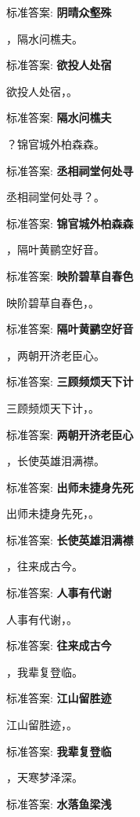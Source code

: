 \documentclass[12pt, a4paper, addpoints]{exam}
\begin{document}
\begin{questions}
标准答案: \textbf{阴晴众壑殊}

\question[1] \uline{\qquad\qquad\qquad}，隔水问樵夫。

标准答案: \textbf{欲投人处宿}

\question[1] 欲投人处宿，\uline{\qquad\qquad\qquad}。

标准答案: \textbf{隔水问樵夫}

\question[1] \uline{\qquad\qquad\qquad}？锦官城外柏森森。

标准答案: \textbf{丞相祠堂何处寻}

\question[1] 丞相祠堂何处寻？\uline{\qquad\qquad\qquad}。

标准答案: \textbf{锦官城外柏森森}

\question[1] \uline{\qquad\qquad\qquad}，隔叶黄鹂空好音。

标准答案: \textbf{映阶碧草自春色}

\question[1] 映阶碧草自春色，\uline{\qquad\qquad\qquad}。

标准答案: \textbf{隔叶黄鹂空好音}

\question[1] \uline{\qquad\qquad\qquad}，两朝开济老臣心。

标准答案: \textbf{三顾频烦天下计}

\question[1] 三顾频烦天下计，\uline{\qquad\qquad\qquad}。

标准答案: \textbf{两朝开济老臣心}

\question[1] \uline{\qquad\qquad\qquad}，长使英雄泪满襟。

标准答案: \textbf{出师未捷身先死}

\question[1] 出师未捷身先死，\uline{\qquad\qquad\qquad}。

标准答案: \textbf{长使英雄泪满襟}

\question[1] \uline{\qquad\qquad\qquad}，往来成古今。

标准答案: \textbf{人事有代谢}

\question[1] 人事有代谢，\uline{\qquad\qquad\qquad}。

标准答案: \textbf{往来成古今}

\question[1] \uline{\qquad\qquad\qquad}，我辈复登临。

标准答案: \textbf{江山留胜迹}

\question[1] 江山留胜迹，\uline{\qquad\qquad\qquad}。

标准答案: \textbf{我辈复登临}

\question[1] \uline{\qquad\qquad\qquad}，天寒梦泽深。

标准答案: \textbf{水落鱼梁浅}


\end{questions}
\end{document}
